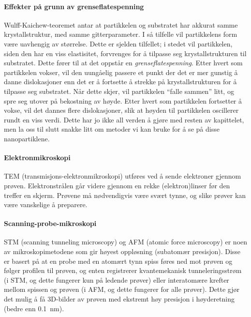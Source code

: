 \paragraph{Effekter på grunn av grenseflatespenning} Wulff-Kaichew-teoremet antar at partikkelen og substratet har akkurat samme krystallstruktur, med samme gitterparameter. I så tilfelle vil partikkelens form være uavhengig av størrelse. Dette er sjelden tilfellet; i stedet vil partikkelen, siden den har en viss elastisitet, forvrenges for å tilpasse seg krystallstrukturen til substratet. Dette fører til at det oppstår en \emph{grenseflatespenning}. Etter hvert som partikkelen vokser, vil den uungåelig passere et punkt der det er mer gunstig å danne dislokasjoner enn det er å fortsette å strekke på krystallstrukturen for å tilpasse seg substratet. Når dette skjer, vil partikkelen ``falle sammen'' litt, og spre seg utover på bekostning av høyde. Etter hvert som partikkelen fortsetter å vokse, vil det dannes flere dislokasjoner, slik at høyden til partikkelen oscillerer rundt en viss verdi.
\vfill
{}
Dette har jo ikke all verden å gjøre med resten av kapittelet, men la oss til slutt snakke litt om metoder vi kan bruke for å se på disse nanopartiklene.

\paragraph{Elektronmikroskopi} TEM (transmisjons-elektron\-mikroskopi) utføres ved å sende elektroner gjennom prøven. Elektronstrålen går videre gjennom en rekke (elektron)linser før den treffer en skjerm. Prøvene må nødvendigvis være svært tynne, og slike prøver kan være vanskelige å preparere.

\paragraph{Scanning-probe-mikroskopi} STM (scanning tunneling microscopy) og AFM (atomic force microscopy) er noen av mikroskopimetodene som gir høyest oppløsning (subatomær presisjon). Disse er basert på at en probe med en atomært tynn spiss føres ned mot prøven og følger profilen til prøven, og enten registrerer kvantemekanisk tunneleringsstrøm (i STM, og dette fungerer kun på ledende prøver) eller interatomære krefter mellom spissen og prøven (i AFM, og dette fungerer for alle prøver). Dette gjør det mulig å få 3D-bilder av prøven med ekstremt høy presisjon i høyderetning (bedre enn \SI{0.1}{\nano\meter}).

